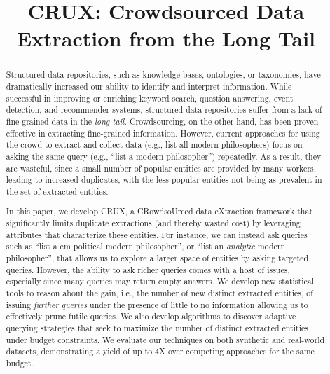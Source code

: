 \documentclass{sig-alternate}
\begin{document}

\title{CRUX: Crowdsourced Data Extraction from the Long Tail}


\maketitle

\begin{abstract}
Structured data repositories, such as knowledge bases, ontologies, or taxonomies, have dramatically increased our ability to identify and interpret information. While successful in improving or enriching keyword search, question answering,  event detection, and recommender systems, structured data repositories suffer from a lack of fine-grained data in the {\em long tail.} Crowdsourcing, on the other hand, has been proven effective in extracting fine-grained information. However, current approaches for using the crowd to extract and collect data (e.g., list all modern philosophers) focus on asking the same query (e.g., ``list a modern philosopher'') repeatedly. As a result, they are wasteful, since a small number of popular entities are provided by many workers, leading to increased duplicates, with the less popular entities not being as prevalent in the set of extracted entities.  

In this paper, we develop CRUX, a CRowdsoUrced data eXtraction framework that significantly limits duplicate extractions (and thereby wasted cost) by leveraging attributes that characterize these entities. For instance, we can instead ask queries such as ``list a {em political} modern philosopher'', or ``list an {\em analytic} modern philosopher'', that allows us to explore a larger space of entities by asking targeted queries. However, the ability to ask richer queries comes with a host of issues, especially since many queries may return empty answers.  We develop new statistical tools to reason about the gain, i.e., the number of new distinct extracted entities, of issuing {\em further queries} under the presence of little to no information allowing us to effectively prune futile queries. We also develop algorithms to discover adaptive querying strategies that seek to maximize the number of distinct extracted entities under budget constraints. We evaluate our techniques on both synthetic and real-world datasets, demonstrating a yield of up to 4X over competing approaches for the same budget.
\end{abstract}
\end{document}
